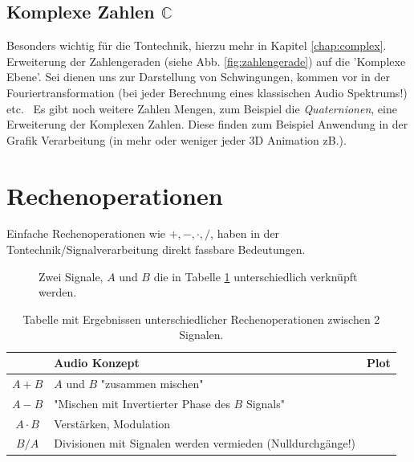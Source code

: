 \subsection{Komplexe Zahlen $\mathbb{C}$}
Besonders wichtig für die Tontechnik, hierzu mehr in Kapitel \ref{chap:complex}. Erweiterung der Zahlengeraden (siehe Abb. \ref{fig:zahlengerade}) auf die 'Komplexe Ebene'. Sei dienen uns zur Darstellung von Schwingungen, kommen vor in der Fouriertransformation (bei jeder Berechnung eines klassischen Audio Spektrums!) etc. \
Es gibt noch weitere Zahlen Mengen, zum Beispiel die \emph{Quaternionen}, eine Erweiterung der Komplexen Zahlen. Diese finden zum Beispiel Anwendung in der Grafik Verarbeitung (in mehr oder weniger jeder 3D Animation zB.). 



\section{Rechenoperationen}

Einfache Rechenoperationen wie $+, -, \cdot, / $, haben in der Tontechnik/Signalverarbeitung direkt fassbare Bedeutungen.


\begin{figure}[h!]
    \centering
        
    \caption{Zwei Signale, $A$ und $B$ die in Tabelle \ref{tab:rechen} unterschiedlich verknüpft werden.}
    \label{fig:signale}
\end{figure}

\begin{table}
\begin{center}
\begin{tabular}{|c|p{5cm}|c|}
    \hline
    \textbf{} & \textbf{Audio Konzept} & \textbf{Plot} \\
    \hline
    $A + B$ & $A$ und $B$ "zusammen mischen" &  \\
    \hline
    $A - B$ & "Mischen mit Invertierter Phase des $B$ Signals"&  \\
    \hline
    $A \cdot B$ & Verstärken, Modulation &  \\
    \hline
    $B / A$ & Divisionen mit Signalen werden vermieden (Nulldurchgänge!) &  \\
    \hline
\end{tabular}
\caption{Tabelle mit Ergebnissen unterschiedlicher Rechenoperationen zwischen 2 Signalen.}
\label{tab:rechen}
\end{center}
\end{table}

